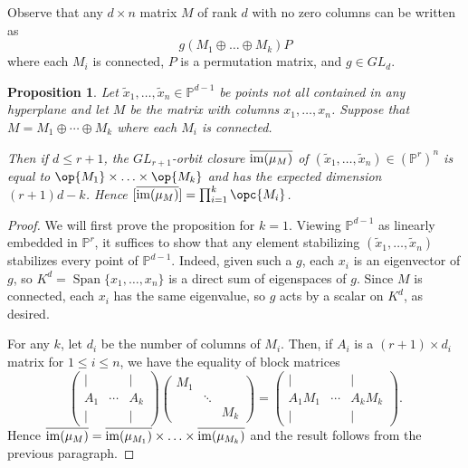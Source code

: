 \documentclass[12pt]{amsart}
\newcommand{\mb}{\mathbb}
\newcommand{\im}{{\rm im}}
\newcommand{\ol}{\overline}
\newcommand{\wt}{\widetilde}
\theoremstyle{plain}
\newtheorem{Prop}[Thm]{Proposition}
\theoremstyle{definition}
\theoremstyle{remark}
\begin{document}
Observe that any $d \times n$ matrix $M$ of rank $d$ with no zero columns can be written as \[g (M_1 \oplus \ldots \oplus M_k) P\] where each $M_i$ is connected, $P$ is a permutation matrix, and $g \in GL_d$.
\begin{Prop}
\label{connectedfact}
Let $\wt{x}_1, \ldots, \wt{x}_n \in \mb{P}^{d-1}$ be points not all contained in any hyperplane and let $M$ be the matrix with columns $x_1, \ldots, x_n$. Suppose that $M = M_1 \oplus \cdots \oplus M_k$ where each $M_i$ is connected.

Then if $d \leq r+1$, the $GL_{r+1}$-orbit closure $\ol{\im(\mu_M)}$ of $(\wt{x}_1, \ldots, \wt{x}_n) \in (\mb{P}^r)^n$ is equal to $\op{M_1} \times \ldots \times \op{M_k}$ and has the expected dimension $(r+1)d - k$. Hence $[\ol{\im(\mu_M)}]=\prod_{i=1}^k \opc{M_i}$.
\end{Prop}
\begin{proof}
We will first prove the proposition for $k=1$. Viewing $\mb{P}^{d-1}$ as linearly embedded in $\mb{P}^r$, it suffices to show that any element stabilizing $(\wt{x}_1, \ldots, \wt{x}_n)$ stabilizes every point of $\mb{P}^{d-1}$. Indeed, given such a $g$, each $x_i$ is an eigenvector of $g$, so $K^{d} = \operatorname{Span} \{x_1, \ldots, x_n\}$ is a direct sum of eigenspaces of $g$. Since $M$ is connected, each $x_i$ has the same eigenvalue, so $g$ acts by a scalar on $K^d$, as desired.

For any $k$, let $d_i$ be the number of columns of $M_i$. Then, if $A_i$  is a $(r+1)\times d_i$ matrix for $1 \leq i \leq n$, we have the equality of block matrices
\[
\begin{pmatrix} 
\vert &  & \vert \\
A_1 & \cdots & A_k \\
\vert &  & \vert 
\end{pmatrix} 
\begin{pmatrix}M_1 & & \\ 
 & \ddots & \\
&  &  M_k
\end{pmatrix} 
= \begin{pmatrix}
\vert &  & \vert \\
A_1 M_1 & \cdots & A_k M_k \\
\vert &  & \vert
\end{pmatrix}.
\]
Hence $\ol{\im(\mu_M)} = \ol{\im(\mu_{M_1})} \times \ldots \times \ol{\im(\mu_{M_k})}$ and the result follows from the previous paragraph.
\end{proof}
\end{document}
